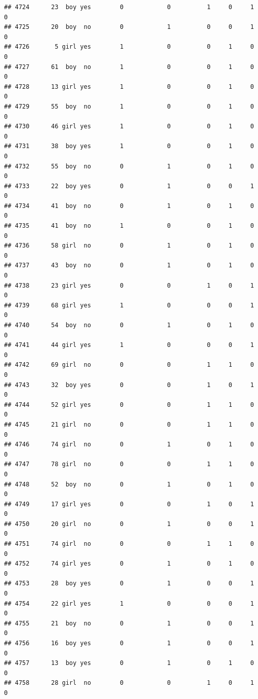 \documentclass[man]{apa6}
\begin{document}
\begin{verbatim}
## 4724      23  boy yes        0            0          1     0     1     0
## 4725      20  boy  no        0            1          0     0     1     0
## 4726       5 girl yes        1            0          0     1     0     0
## 4727      61  boy  no        1            0          0     1     0     0
## 4728      13 girl yes        1            0          0     1     0     0
## 4729      55  boy  no        1            0          0     1     0     0
## 4730      46 girl yes        1            0          0     1     0     0
## 4731      38  boy yes        1            0          0     1     0     0
## 4732      55  boy  no        0            1          0     1     0     0
## 4733      22  boy yes        0            1          0     0     1     0
## 4734      41  boy  no        0            1          0     1     0     0
## 4735      41  boy  no        1            0          0     1     0     0
## 4736      58 girl  no        0            1          0     1     0     0
## 4737      43  boy  no        0            1          0     1     0     0
## 4738      23 girl yes        0            0          1     0     1     0
## 4739      68 girl yes        1            0          0     0     1     0
## 4740      54  boy  no        0            1          0     1     0     0
## 4741      44 girl yes        1            0          0     0     1     0
## 4742      69 girl  no        0            0          1     1     0     0
## 4743      32  boy yes        0            0          1     0     1     0
## 4744      52 girl yes        0            0          1     1     0     0
## 4745      21 girl  no        0            0          1     1     0     0
## 4746      74 girl  no        0            1          0     1     0     0
## 4747      78 girl  no        0            0          1     1     0     0
## 4748      52  boy  no        0            1          0     1     0     0
## 4749      17 girl yes        0            0          1     0     1     0
## 4750      20 girl  no        0            1          0     0     1     0
## 4751      74 girl  no        0            0          1     1     0     0
## 4752      74 girl yes        0            1          0     1     0     0
## 4753      28  boy yes        0            1          0     0     1     0
## 4754      22 girl yes        1            0          0     0     1     0
## 4755      21  boy  no        0            1          0     0     1     0
## 4756      16  boy yes        0            1          0     0     1     0
## 4757      13  boy yes        0            1          0     1     0     0
## 4758      28 girl  no        0            0          1     0     1     0

\end{verbatim}
\end{document}
